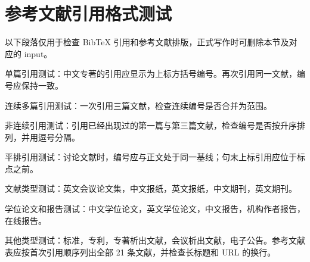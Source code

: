 \section{参考文献引用格式测试}
以下段落仅用于检查 BibTeX 引用和参考文献排版，正式写作时可删除本节及对应的 input。

单篇引用测试：中文专著的引用应显示为上标方括号编号。再次引用同一文献，编号应保持一致。

连续多篇引用测试：一次引用三篇文献，检查连续编号是否合并为范围。

非连续引用测试：引用已经出现过的第一篇与第三篇文献，检查编号是否按升序排列，并用逗号分隔。

平排引用测试：讨论文献\cite{chen2000}时，编号应与正文处于同一基线；句末上标引用应位于标点之前。

文献类型测试：英文会议论文集，中文报纸，英文报纸，中文期刊，英文期刊。

学位论文和报告测试：中文学位论文，英文学位论文，中文报告，机构作者报告，在线报告。

其他类型测试：标准，专利，专著析出文献，会议析出文献，电子公告。参考文献表应按首次引用顺序列出全部 21 条文献，并检查长标题和 URL 的换行。
